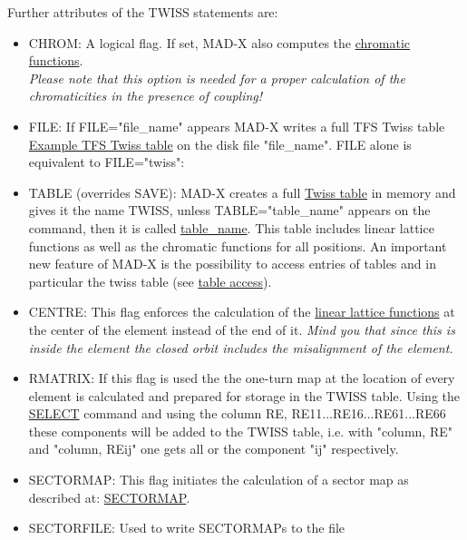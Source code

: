 Further attributes of the TWISS statements are: 
\begin{itemize}
	\item CHROM: A logical flag. If set, MAD-X also computes the
          \href{../Introduction/tables.html#chrom}{chromatic
            functions}.  \\
          \textit{Please note that this option is needed for a proper calculation of the chromaticities in the presence of coupling!}
	\item FILE: If FILE="file\_name" appears MAD-X writes a full TFS
          Twiss table \href{../Introduction/select.html#tfs}{Example TFS
            Twiss table} on the disk file "file\_name". FILE alone is
          equivalent to FILE="twiss":  
	\item TABLE (overrides SAVE): MAD-X creates a full
          \href{../Introduction/tables.html#linear}{Twiss table} in
          memory and gives it the name TWISS, unless TABLE="table\_name"
          appears on the command, then it is called
          \href{../Introduction/label.html}{table\_name}. This table
          includes linear lattice functions as well as the chromatic
          functions for all positions. An important new feature of MAD-X
          is the possibility to access entries of tables and in
          particular the twiss table (see
          \href{../Introduction/expression.html#table}{table access}).    
	\item CENTRE: This flag enforces the calculation of the
          \href{../Introduction/tables.html#linear}{linear lattice
            functions} at the center of the element instead of the end
          of it. \textit{ Mind you that since this is inside the element
            the closed orbit includes the misalignment of the element.} 
	\item RMATRIX: If this flag is used the the one-turn map at the
          location of every element is calculated and prepared for
          storage in the TWISS table. Using the
          \href{../Introduction/select.html}{SELECT} command and using
          the column RE, RE11...RE16...RE61...RE66 these components will
          be added to the TWISS table, i.e. with "column, RE" and
          "column, REij" one gets all or the component "ij"
          respectively.    
	\item SECTORMAP: This flag initiates the calculation of a sector
          map as described at:
          \href{../Introduction/sectormap.html}{SECTORMAP}.    
	\item SECTORFILE: Used to write SECTORMAPs to the file

\end{itemize}
